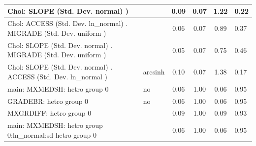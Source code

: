 \begin{table}
\begin{center}
\begin{tabular}{|l|l|c|c|c|l|}
			\hline
			 Chol: SLOPE (Std. Dev. normal) ) &  & 0.09 & 0.07 & 1.22 & 0.22 \\
			\hline
			 Chol: ACCESS (Std. Dev. ln_normal) . MIGRADE (Std. Dev.   uniform ) &  & 0.06 & 0.07 & 0.89 & 0.37 \\
			\hline
			 Chol: SLOPE (Std. Dev. normal) . MIGRADE (Std. Dev.   uniform ) &  & 0.05 & 0.07 & 0.75 & 0.46 \\
			\hline
			 Chol: SLOPE (Std. Dev. normal) . ACCESS (Std. Dev.   ln_normal ) & arcsinh & 0.10 & 0.07 & 1.38 & 0.17 \\
			\hline
			main: MXMEDSH: hetro group 0 & no & 0.06 & 1.00 & 0.06 & 0.95 \\
			\hline
			GRADEBR: hetro group 0 & no & 0.06 & 1.00 & 0.06 & 0.95 \\
			\hline
			MXGRDIFF: hetro group 0 &  & 0.09 & 1.00 & 0.09 & 0.93 \\
			\hline
			main: MXMEDSH: hetro group 0:ln_normal:sd  hetro group 0 &  & 0.06 & 1.00 & 0.06 & 0.95 \\
			\hline
		\end{tabular}
	\end{center}
\end{table}